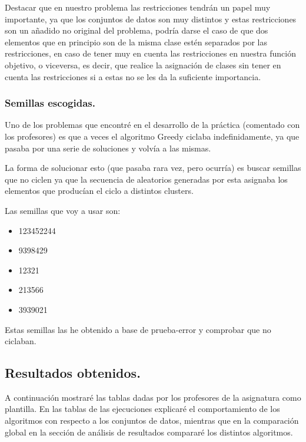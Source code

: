 \documentclass[12pt, spanish]{article}
\begin{document}
Destacar que en nuestro problema las restricciones tendrán un papel muy importante, ya que los conjuntos de datos son muy distintos y estas restricciones son un añadido no original del problema, podría darse el caso de que dos elementos que en principio son de la misma clase estén separados por las restricciones, en caso de tener muy en cuenta las restricciones en nuestra función objetivo, o viceversa, es decir, que realice la asignación de clases sin tener en cuenta las restricciones si a estas no se les da la suficiente importancia.

\newpage



\subsubsection{Semillas escogidas.}

Uno de los problemas que encontré en el desarrollo de la práctica (comentado con los profesores) es que a veces el algoritmo Greedy ciclaba indefinidamente, ya que pasaba por una serie de soluciones y volvía a las mismas.

La forma de solucionar esto (que pasaba rara vez, pero ocurría) es buscar semillas que no ciclen ya que la secuencia de aleatorios generadas por esta asignaba los elementos que producían el ciclo a distintos clusters.

Las semillas que voy a usar son:

\begin{itemize}
	\item {123452244}
	\item {9398429}
	\item {12321}
	\item {213566}
	\item {3939021}
\end{itemize}

Estas semillas las he obtenido a base de prueba-error y comprobar que no ciclaban.

\newpage

\subsection{Resultados obtenidos.}

A continuación mostraré las tablas dadas por los profesores de la asignatura como plantilla. En las tablas de las ejecuciones explicaré el comportamiento de los algoritmos con respecto a los conjuntos de datos, mientras que en la comparación global en la sección de análisis de resultados compararé los distintos algoritmos.
\end{document}
